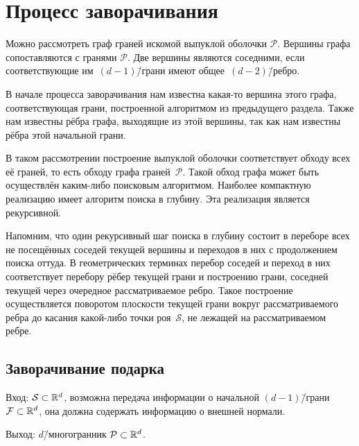 \documentclass[a4paper,12pt]{article}
\newcommand{\R}[1][]{%
  \ifthenelse{\equal{#1}{}}%
  {\mathbb{R}}%
  {\mathbb{R}^{#1}}}
\newcommand{\Swarm}{\mathcal{S}}              %
\newcommand{\Polytop}{\mathcal{P}}         %
\newcommand{\Facet}{\mathcal{F}}              %
\renewcommand{\.}{\hspace{0.2ex}}
\begin{document}
\section{Процесс заворачивания}
  Можно рассмотреть граф граней искомой выпуклой оболочки $\Polytop$. Вершины графа сопоставляются с гранями $\Polytop$. Две вершины являются соседними, если соответствующие им~$(d-1)$\=/грани имеют общее~$(d-2)$\=/ребро.

  В начале процесса заворачивания нам известна какая-то вершина этого графа, соответствующая грани, построенной алгоритмом из предыдущего раздела. Также нам известны рёбра графа, выходящие из этой вершины, так как нам известны рёбра этой начальной грани.

  В таком рассмотрении построение выпуклой оболочки соответствует обходу всех её граней, то есть обходу графа граней~$\Polytop$. Такой обход графа может быть осуществлён каким-либо поисковым алгоритмом. Наиболее компактную реализацию имеет алгоритм поиска в глубину. Эта реализация является рекурсивной.

  Напомним, что один рекурсивный шаг поиска в глубину состоит в переборе всех не посещённых соседей текущей вершины и переходов в них с продолжением поиска оттуда. В геометрических терминах перебор соседей и переход в них соответствует перебору рёбер текущей грани и построению грани, соседней текущей через очередное рассматриваемое ребро. Такое построение осуществляется поворотом плоскости текущей грани вокруг рассматриваемого ребра до касания какой-либо точки роя~$\Swarm$, не лежащей на рассматриваемом ребре.

  \subsection{Заворачивание подарка}
  \label{subsec:GW}

    Вход: $\Swarm \subset \R[d]$, возможна передача информации о начальной $(d-1)$\=/грани $\Facet \subset \R[d]$, она должна содержать информацию о внешней нормали.

    Выход: $d$\=/многогранник $\Polytop \subset \R[d]$.
\end{document}
